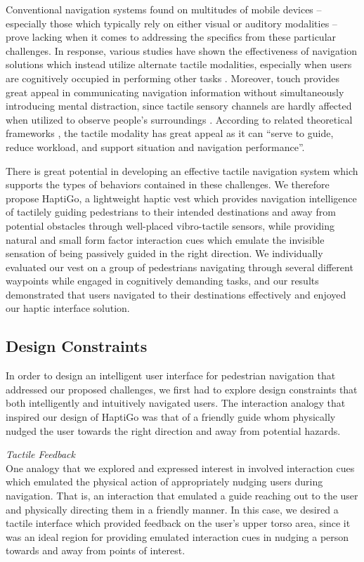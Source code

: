 \documentclass{sigchi}
\begin{document}
Conventional navigation systems found on multitudes of mobile devices -- especially those which typically rely on either visual or auditory modalities -- prove lacking when it comes to addressing the specifics from these particular challenges.  In response, various studies have shown the effectiveness of navigation solutions which instead utilize alternate tactile modalities, especially when users are cognitively occupied in performing other tasks \cite{2010_Elliott_IEEEHaptics}.  Moreover, touch provides great appeal in communicating navigation information without simultaneously introducing mental distraction, since tactile sensory channels are hardly affected when utilized to observe people’s surroundings \cite{2012_Pielot_CHI}.  According to related theoretical frameworks \cite{2010_Elliott_IEEEHaptics, 2002_Wickens_ErgoScience}, the tactile modality has great appeal as it can “serve to guide, reduce workload, and support situation and navigation performance”.

There is great potential in developing an effective tactile navigation system which supports the types of behaviors contained in these challenges.  We therefore propose HaptiGo, a lightweight haptic vest which provides navigation intelligence of tactilely guiding pedestrians to their intended destinations and away from potential obstacles through well-placed vibro-tactile sensors, while providing natural and small form factor interaction cues which emulate the invisible sensation of being passively guided in the right direction. We individually evaluated our vest on a group of pedestrians navigating through several different waypoints while engaged in cognitively demanding tasks, and our results demonstrated that users navigated to their destinations effectively and enjoyed our haptic interface solution.

\subsection{Design Constraints}
In order to design an intelligent user interface for pedestrian navigation that addressed our proposed challenges, we first had to explore design constraints that both intelligently and intuitively navigated users.  The interaction analogy that inspired our design of HaptiGo was that of a friendly guide whom physically nudged the user towards the right direction and away from potential hazards.

\textit{Tactile Feedback}\\
One analogy that we explored and expressed interest in involved interaction cues which emulated the physical action of appropriately nudging users during navigation.  That is, an interaction that emulated a guide reaching out to the user and physically directing them in a friendly manner.  In this case, we desired a tactile interface which provided feedback on the user's upper torso area, since it was an ideal region for providing emulated interaction cues in nudging a person towards and away from points of interest.
\end{document}
